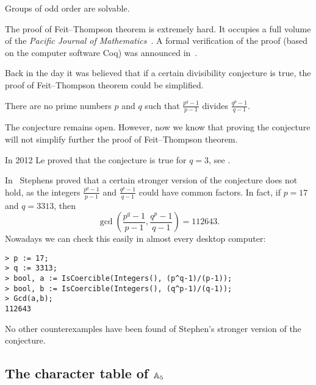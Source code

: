\begin{theorem}
    Groups of odd order are solvable. 
\end{theorem}

The proof of Feit--Thompson theorem is extremely hard. 
It occupies a full volume of the 
\emph{Pacific Journal of Mathematics}~\cite{MR166261}. 
A formal verification of the proof 
(based on the computer software Coq) 
was announced in~\cite{MR3111271}.  

Back in the day it was believed that if a certain divisibility 
conjecture is true, 
the proof of Feit--Thompson theorem 
could be simplified. 

\begin{conjecture}
    There are no prime numbers $p$ and $q$ such that
    $\frac {p^{q}-1}{p-1}$ divides $\frac{q^{p} - 1}{q - 1}$. 
\end{conjecture}

The conjecture remains open. However, now we know that 
proving the conjecture will not simplify further
the proof of Feit--Thompson theorem. 

In 2012 Le proved that the conjecture is true for $q=3$, see 
\cite{MR2900154}. 


In~\cite{MR297686} 
Stephens proved that a certain stronger version of the conjecture 
does not hold, as the integers 
$\frac {p^{q}-1}{p-1}$ and $\frac{q^{p} - 1}{q - 1}$ 
could have common factors. In fact, if $p=17$ and $q=3313$, 
then 
\[
\gcd\left(\frac {p^{q}-1}{p-1},\frac{q^{p} - 1}{q - 1}\right)=112643.
\]
Nowadays we can check this easily in almost every desktop computer:
\begin{lstlisting}
> p := 17; 
> q := 3313;
> bool, a := IsCoercible(Integers(), (p^q-1)/(p-1));
> bool, b := IsCoercible(Integers(), (q^p-1)/(q-1));
> Gcd(a,b);
112643    
\end{lstlisting}
No other counterexamples have been found of Stephen’s stronger version of the conjecture.



\subsection{The character table of \texorpdfstring{$\mathbb{A}_5$}{A5}}

